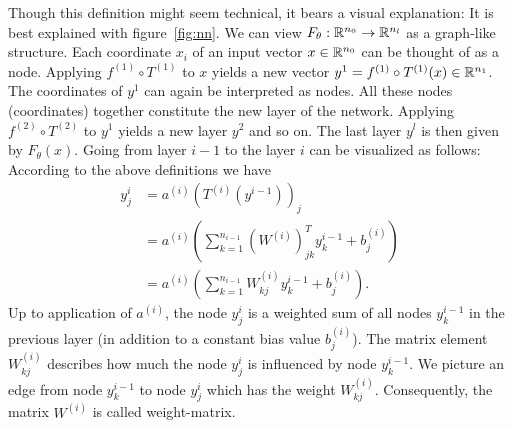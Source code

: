 Though this definition might seem technical, it bears a visual explanation:
It is best explained with figure~\ref{fig:nn}. We can view $F_\theta:\mathbb{R}^{n_0}\to\mathbb{R}^{n_l}$ as a graph-like structure. Each coordinate $x_i$ 
of an input vector $x\in\mathbb{R}^{n_0}$ can be thought of as a node. Applying $f^{(1)}\circ T^{(1)}$ to $x$ yields a
new vector $y^1=f^{(1)}\circ T^{(1)}(x)\in\mathbb{R}^{n_1}$. The coordinates of $y^1$ can again be interpreted as nodes. All these nodes (coordinates) together constitute the new layer
of the network. Applying $f^{(2)}\circ T^{(2)}$ to $y^1$ yields a new layer $y^2$ and so on. The last layer $y^l$ is then given by $F_\theta(x)$.
Going from layer $i-1$ to the layer $i$ can be visualized as follows: 
According to the above definitions we have
\begin{align*}
    y^{i}_j&=a^{(i)}\left(T^{(i)}\left(y^{i-1}\right)\right)_j\\
    &=a^{(i)}\left(\sum_{k=1}^{n_{i-1}}\left(W^{(i)}\right)^T_{jk}y^{i-1}_k+b^{(i)}_j\right)\\
    &=a^{(i)}\left(\sum_{k=1}^{n_{i-1}}W^{(i)}_{kj}y^{i-1}_k+b^{(i)}_j\right).
\end{align*}
Up to application of $a^{(i)}$, the node $y^i_j$ is a weighted sum of all nodes $y^{i-1}_k$ in the previous layer (in addition to a constant bias value $b^{(i)}_j$).
The matrix element $W^{(i)}_{kj}$ describes how much the node $y^i_j$ is influenced by node $y^{i-1}_k$. 
We picture an edge from node $y^{i-1}_k$ to node $y^i_j$ which has the weight $W^{(i)}_{kj}$. Consequently, the matrix $W^{(i)}$ is called weight-matrix.
